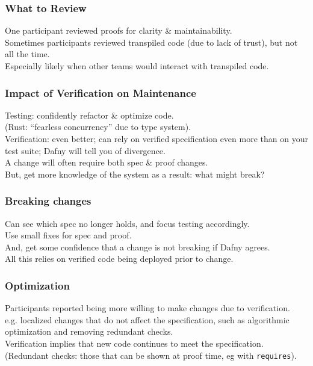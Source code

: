 \documentclass{beamer}
\newenvironment{changemargin}[1]{%
  \begin{list}{}{%
    \setlength{\topsep}{0pt}%
    \setlength{\leftmargin}{#1}%
    \setlength{\rightmargin}{1em}
    \setlength{\listparindent}{\parindent}%
    \setlength{\itemindent}{\parindent}%
    \setlength{\parsep}{\parskip}%
  }%
  \item[]}{\end{list}}
\begin{document}
\begin{frame}
  \frametitle{What to Review}
  \Large
  \begin{changemargin}{1cm}
    One participant reviewed proofs for clarity \& maintainability.\\[1em]
    Sometimes participants reviewed transpiled code (due to lack of trust), but not all the time.\\[1em]
    Especially likely when other teams would interact with transpiled code.
  \end{changemargin}
\end{frame}

\begin{frame}
  \frametitle{Impact of Verification on Maintenance}
  \Large
  \begin{changemargin}{1cm}
    Testing: confidently refactor \& optimize code.\\
    (Rust: ``fearless concurrency'' due to type system).\\[2em]
    Verification: even better; can rely on verified specification even more than on your test suite; Dafny will tell you of divergence.\\[2em]
    A change will often require both spec \& proof changes.\\
    But, get more knowledge of the system as a result: what might break?
  \end{changemargin}
\end{frame}

\begin{frame}
  \frametitle{Breaking changes}
  \Large
  \begin{changemargin}{1cm}
    Can see which spec no longer holds, and focus testing accordingly.\\[1em]
    Use small fixes for spec and proof.\\[2em]
    And, get some confidence that a change is not breaking if Dafny agrees.\\[2em]
    All this relies on verified code being deployed prior to change.
  \end{changemargin}
\end{frame}
    
\begin{frame}
  \frametitle{Optimization}
  \Large
  \begin{changemargin}{1cm}
    Participants reported being more willing to make changes due to verification.\\[1em]
    e.g. localized changes that do not affect the specification, such as algorithmic optimization and removing redundant checks.\\[2em]
    Verification implies that new code continues to meet the specification.\\[1em]
    (Redundant checks: those that can be shown at proof time, eg with \texttt{requires}).
  \end{changemargin}
\end{frame}
\end{document}
